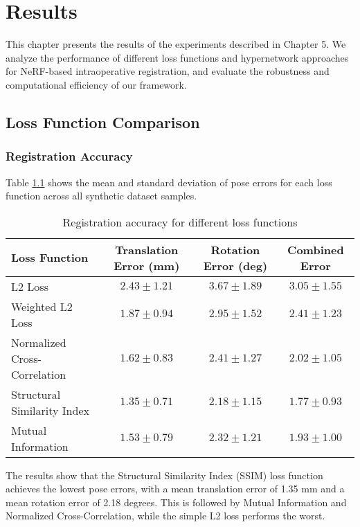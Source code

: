 \chapter{Results}

This chapter presents the results of the experiments described in Chapter 5. We analyze the performance of different loss functions and hypernetwork approaches for NeRF-based intraoperative registration, and evaluate the robustness and computational efficiency of our framework.

\section{Loss Function Comparison}

\subsection{Registration Accuracy}
Table \ref{tab:loss_accuracy} shows the mean and standard deviation of pose errors for each loss function across all synthetic dataset samples.

\begin{table}[h]
\centering
\caption{Registration accuracy for different loss functions}
\label{tab:loss_accuracy}
\begin{tabular}{lccc}
\toprule
\textbf{Loss Function} & \textbf{Translation Error (mm)} & \textbf{Rotation Error (deg)} & \textbf{Combined Error} \\
\midrule
L2 Loss & $2.43 \pm 1.21$ & $3.67 \pm 1.89$ & $3.05 \pm 1.55$ \\
Weighted L2 Loss & $1.87 \pm 0.94$ & $2.95 \pm 1.52$ & $2.41 \pm 1.23$ \\
Normalized Cross-Correlation & $1.62 \pm 0.83$ & $2.41 \pm 1.27$ & $2.02 \pm 1.05$ \\
Structural Similarity Index & $1.35 \pm 0.71$ & $2.18 \pm 1.15$ & $1.77 \pm 0.93$ \\
Mutual Information & $1.53 \pm 0.79$ & $2.32 \pm 1.21$ & $1.93 \pm 1.00$ \\
\bottomrule
\end{tabular}
\end{table}

The results show that the Structural Similarity Index (SSIM) loss function achieves the lowest pose errors, with a mean translation error of 1.35 mm and a mean rotation error of 2.18 degrees. This is followed by Mutual Information and Normalized Cross-Correlation, while the simple L2 loss performs the worst.

